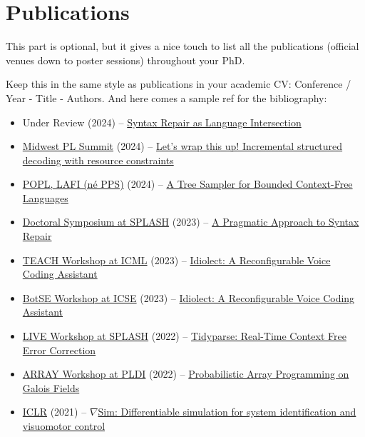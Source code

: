 \chapter*{\rm\bfseries Publications}
\label{ch:publications}

This part is optional, but it gives a nice touch to list all the publications (official venues down to poster sessions) throughout your PhD.

Keep this in the same style as publications in your academic CV:
Conference / Year - Title - Authors. And here comes a sample ref for the bibliography: \cite{considine2023pragmatic}

\begin{itemize}
\item Under Review (2024) -- \href{https://breandan.net/public/tidyparse.pdf}{Syntax Repair as Language Intersection}
\item \href{https://pl.cs.uchicago.edu/PLSummit/2024/}{Midwest PL Summit} (2024) -- \href{https://github.com/breandan/galoisenne/blob/master/latex/tacm2024/tacm_poster.pdf}{Let's wrap this up! Incremental structured decoding with resource constraints}
\item \href{https://popl24.sigplan.org/home/lafi-2024}{POPL, LAFI (n\'e PPS)} (2024) -- \href{https://popl24.sigplan.org/home/lafi-2024}{A Tree Sampler for Bounded Context-Free Languages}
\item \href{https://2023.splashcon.org/track/splash-2023-Doctoral-Symposium}{Doctoral Symposium at SPLASH} (2023) -- \href{https://breandan.net/public/pragmatic_syntax_repair.pdf}{A Pragmatic Approach to Syntax Repair}
\item \href{https://sites.google.com/view/teach-icml-23}{TEACH Workshop at ICML} (2023) -- \href{https://github.com/OpenASR/idiolect/blob/master/latex/teach23/teach.pdf}{Idiolect: A Reconfigurable Voice Coding Assistant}
\item \href{http://botse.org/}{BotSE Workshop at ICSE} (2023) -- \href{https://github.com/OpenASR/idiolect/blob/master/latex/botse23/botse.pdf}{Idiolect: A Reconfigurable Voice Coding Assistant}
\item \href{http://liveprog.org/}{LIVE Workshop at SPLASH} (2022) -- \href{https://github.com/breandan/galoisenne/blob/master/latex/splash2022/acmart.pdf}{Tidyparse: Real-Time Context Free Error Correction}
\item \href{https://pldi22.sigplan.org/home/ARRAY-2022#program}{ARRAY Workshop at PLDI} (2022) -- \href{https://github.com/breandan/galoisenne/blob/master/latex/array/acmart.pdf}{Probabilistic Array Programming on Galois Fields}
\item \href{https://iclr.cc/Conferences/2021/}{ICLR} (2021) -- \href{https://arxiv.org/abs/2104.02646}{$\nabla$Sim: Differentiable simulation for system identification and visuomotor control}
\end{itemize}
